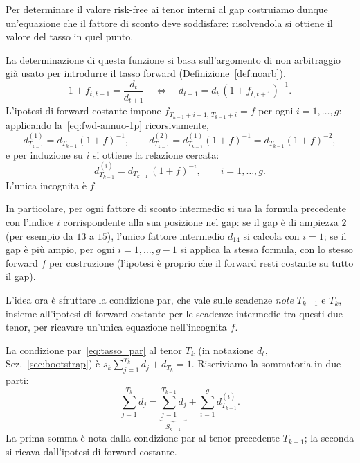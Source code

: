 \documentclass[11pt,a4paper]{article}
\theoremstyle{plain}
\theoremstyle{definition}
\theoremstyle{remark}
\begin{document}
Per determinare il valore risk-free ai tenor interni al gap costruiamo dunque un'equazione che
il fattore di sconto deve soddisfare: risolvendola si ottiene il valore del tasso in quel punto.

La determinazione di questa funzione si basa sull'argomento di non arbitraggio gi\`a usato per introdurre il tasso forward
(Definizione~\ref{def:noarb}).%
\begin{equation}
  \label{eq:fwd-annuo-1p}
  1 + f_{t,t+1} = \frac{d_t}{d_{t+1}}
  \quad\Longleftrightarrow\quad
  d_{t+1} = d_t\,(1+f_{t,t+1})^{-1}.
\end{equation}
L'ipotesi di forward costante impone $f_{T_{k-1}+i-1,\,T_{k-1}+i} = f$ per ogni
$i=1,\ldots,g$: applicando la~\eqref{eq:fwd-annuo-1p} ricorsivamente,
\[
  d^{(1)}_{T_{k-1}} = d_{T_{k-1}}(1+f)^{-1},
  \qquad
  d^{(2)}_{T_{k-1}} = d^{(1)}_{T_{k-1}}(1+f)^{-1} = d_{T_{k-1}}(1+f)^{-2},
\]
e per induzione su $i$ si ottiene la relazione cercata:
\begin{equation}
  \label{eq:cf}
  d^{(i)}_{T_{k-1}} = d_{T_{k-1}}\,(1+f)^{-i}, \qquad i=1,\ldots,g.
\end{equation}
L'unica incognita \`e $f$.

In particolare, per ogni fattore di sconto intermedio si usa la formula precedente con
l'indice $i$ corrispondente alla sua posizione nel gap: se il gap \`e di ampiezza $2$ (per
esempio da $13$ a $15$), l'unico fattore intermedio $d_{14}$ si calcola con $i=1$; se il gap
\`e pi\`u ampio, per ogni $i=1,\ldots,g-1$ si applica la stessa formula, con lo stesso forward
$f$ per costruzione (l'ipotesi \`e proprio che il forward resti costante su tutto il gap).

L'idea ora \`e sfruttare la condizione par, che vale sulle scadenze \emph{note} $T_{k-1}$ e
$T_k$, insieme all'ipotesi di forward costante per le scadenze intermedie tra questi due
tenor, per ricavare un'unica equazione nell'incognita $f$.

La condizione par~\eqref{eq:tasso_par} al tenor $T_k$ (in notazione $d_t$,
Sez.~\ref{sec:bootstrap}) \`e $s_k\sum_{j=1}^{T_k} d_j + d_{T_k} = 1$. Riscriviamo la sommatoria in due parti:
\[
  \sum_{j=1}^{T_k} d_j = \underbrace{\sum_{j=1}^{T_{k-1}} d_j}_{S_{k-1}} + \sum_{i=1}^{g} d^{(i)}_{T_{k-1}}.
\]
La prima somma \`e nota dalla condizione par al tenor precedente $T_{k-1}$; la seconda si
ricava dall'ipotesi di forward costante.
\end{document}
